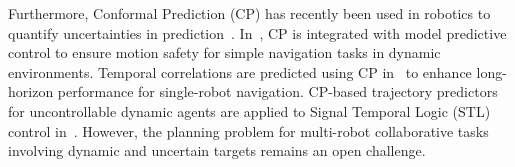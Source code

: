 Furthermore, Conformal Prediction (CP) has recently been used
in robotics to quantify uncertainties in
prediction~\cite{Lars2023CP,tonkens2023,Yu2023CP}.
In~\cite{Lars2023CP},
CP is integrated with model predictive control to ensure motion safety
for simple navigation tasks in dynamic environments.
Temporal correlations are predicted using CP in~\cite{tonkens2023}
to enhance long-horizon performance for single-robot navigation.
CP-based trajectory predictors for uncontrollable dynamic agents
are applied to Signal Temporal Logic (STL) control
in~\cite{Yu2023CP}.
However, the planning problem for multi-robot collaborative tasks
involving dynamic and uncertain targets remains an open challenge.
